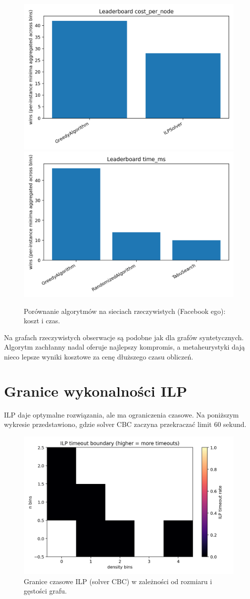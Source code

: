 \begin{figure}[h]
  \centering
  \includegraphics[width=0.48\linewidth]{assets/figures/br_leaderboard_cost.png}
  \includegraphics[width=0.48\linewidth]{assets/figures/br_leaderboard_time.png}
  \caption{Porównanie algorytmów na sieciach rzeczywistych (Facebook ego): koszt i czas.}
  \label{fig:facebook_results}
\end{figure}

Na grafach rzeczywistych obserwacje są podobne jak dla grafów syntetycznych. Algorytm zachłanny nadal oferuje najlepszy kompromis, a metaheurystyki dają nieco lepsze wyniki kosztowe za cenę dłuższego czasu obliczeń.

\section{Granice wykonalności ILP}

ILP daje optymalne rozwiązania, ale ma ograniczenia czasowe. Na poniższym wykresie przedstawiono, gdzie solver CBC zaczyna przekraczać limit 60 sekund.

\begin{figure}[h]
  \centering
  \includegraphics[width=0.7\linewidth]{assets/figures/ba_ilp_timeout_boundary.png}
  \caption{Granice czasowe ILP (solver CBC) w zależności od rozmiaru i gęstości grafu.}
  \label{fig:ilp_limits}
\end{figure}

